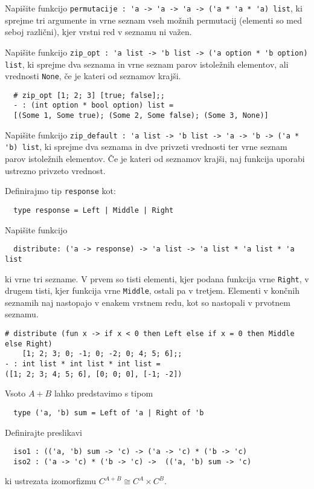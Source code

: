 \documentclass[arhiv]{../izpit}
\begin{document}


\naloga

\podnaloga
Napišite funkcijo \verb|permutacije : 'a -> 'a -> 'a -> ('a * 'a * 'a) list|, ki sprejme tri argumente in vrne seznam vseh možnih permutacij (elementi so med seboj različni), kjer vrstni red v seznamu ni važen.

\podnaloga
Napišite funkcijo \verb|zip_opt : 'a list -> 'b list -> ('a option * 'b option) list|, ki sprejme dva seznama in vrne seznam parov istoležnih elementov, ali vrednosti \verb|None|, če je kateri od seznamov krajši.

\begin{verbatim}
  # zip_opt [1; 2; 3] [true; false];;
  - : (int option * bool option) list =
  [(Some 1, Some true); (Some 2, Some false); (Some 3, None)]
\end{verbatim}
  
\podnaloga
Napišite funkcijo \verb|zip_default : 'a list -> 'b list -> 'a -> 'b -> ('a * 'b) list|, ki sprejme dva seznama in dve privzeti vrednosti ter vrne seznam parov istoležnih elementov. Če je kateri od seznamov krajši, naj funkcija uporabi ustrezno privzeto vrednost.

\podnaloga
Definirajmo tip \verb|response| kot:
\begin{verbatim}
  type response = Left | Middle | Right
\end{verbatim}
Napišite funkcijo
\begin{verbatim}
  distribute: ('a -> response) -> 'a list -> 'a list * 'a list * 'a list
\end{verbatim}
ki vrne tri sezname. V prvem so tisti elementi, kjer podana funkcija vrne \verb|Right|, v drugem tisti, kjer funkcija vrne \verb|Middle|, ostali pa v tretjem. Elementi v končnih seznamih naj nastopajo v enakem vrstnem redu, kot so nastopali v prvotnem seznamu.

\begin{verbatim}
# distribute (fun x -> if x < 0 then Left else if x = 0 then Middle else Right) 
    [1; 2; 3; 0; -1; 0; -2; 0; 4; 5; 6];;
- : int list * int list * int list =
([1; 2; 3; 4; 5; 6], [0; 0; 0], [-1; -2])
\end{verbatim}

\podnaloga
Vsoto $A + B$ lahko predstavimo s tipom
\begin{verbatim}
  type ('a, 'b) sum = Left of 'a | Right of 'b
\end{verbatim}
Definirajte preslikavi
\begin{verbatim}
  iso1 : (('a, 'b) sum -> 'c) -> ('a -> 'c) * ('b -> 'c)
  iso2 : ('a -> 'c) * ('b -> 'c) ->  (('a, 'b) sum -> 'c)
\end{verbatim}
ki ustrezata izomorfizmu $C^{A + B} \cong C^A \times C^B$.
\end{document}
